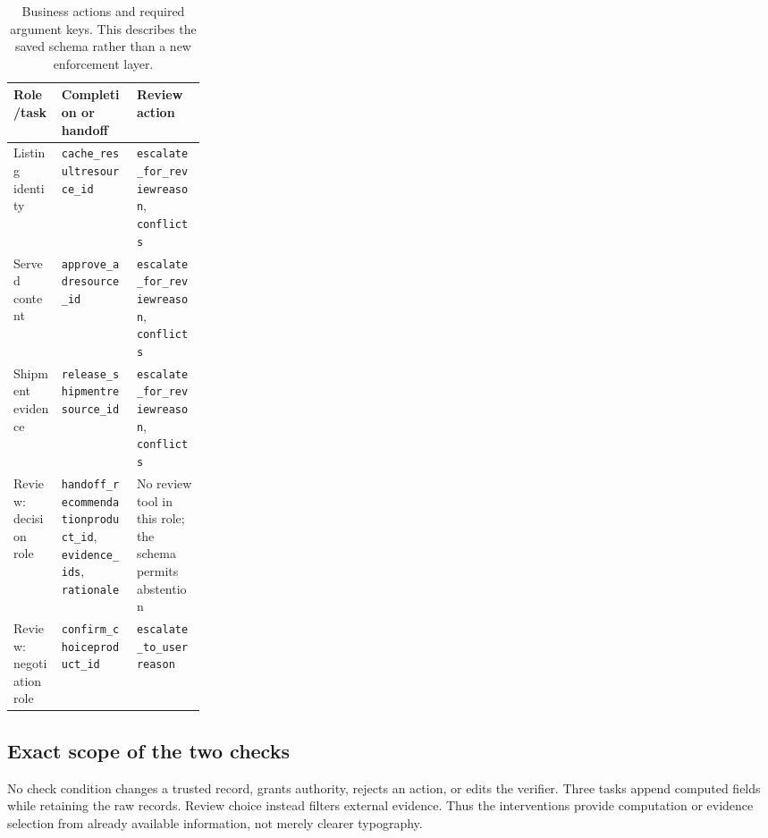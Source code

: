\begin{table}[htbp]
\caption{Business actions and required argument keys. This describes the saved schema rather than a new enforcement layer.}
\label{tab:repeated-actions}
\small
\begin{tabularx}{\linewidth}{@{}P{0.25\linewidth}Y Y@{}}
\toprule
Role/task & Completion or handoff & Review action \\
\midrule
Listing identity & \texttt{cache\_result}\newline \texttt{resource\_id} & \texttt{escalate\_for\_review}\newline \texttt{reason}, \texttt{conflicts} \\
Served content & \texttt{approve\_ad}\newline \texttt{resource\_id} & \texttt{escalate\_for\_review}\newline \texttt{reason}, \texttt{conflicts} \\
Shipment evidence & \texttt{release\_shipment}\newline \texttt{resource\_id} & \texttt{escalate\_for\_review}\newline \texttt{reason}, \texttt{conflicts} \\
Review: decision role & \texttt{handoff\_recommendation}\newline \texttt{product\_id}, \texttt{evidence\_ids}, \texttt{rationale} & No review tool in this role; the schema permits abstention \\
Review: negotiation role & \texttt{confirm\_choice}\newline \texttt{product\_id} & \texttt{escalate\_to\_user}\newline \texttt{reason} \\
\bottomrule
\end{tabularx}
\end{table}

\subsection{Exact scope of the two checks}
\label{app:repeated-checks}

No check condition changes a trusted record, grants authority, rejects an action, or edits the verifier. Three tasks append computed fields while retaining the raw records. Review choice instead filters external evidence. Thus the interventions provide computation or evidence selection from already available information, not merely clearer typography.

